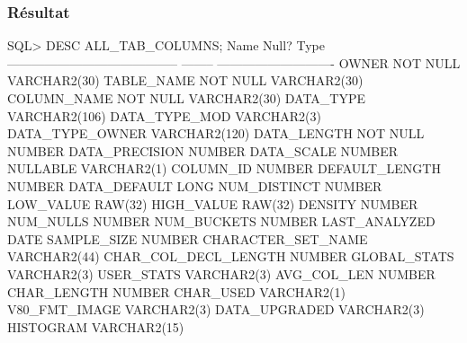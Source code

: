 \documentclass[•]{article}
\begin{document}
\subsubsection{Résultat}
\begin{sql}
SQL> DESC ALL_TAB_COLUMNS;
 Name                                      Null?    Type
 ----------------------------------------- -------- ----------------------------
 OWNER                                     NOT NULL VARCHAR2(30)
 TABLE_NAME                                NOT NULL VARCHAR2(30)
 COLUMN_NAME                               NOT NULL VARCHAR2(30)
 DATA_TYPE                                          VARCHAR2(106)
 DATA_TYPE_MOD                                      VARCHAR2(3)
 DATA_TYPE_OWNER                                    VARCHAR2(120)
 DATA_LENGTH                               NOT NULL NUMBER
 DATA_PRECISION                                     NUMBER
 DATA_SCALE                                         NUMBER
 NULLABLE                                           VARCHAR2(1)
 COLUMN_ID                                          NUMBER
 DEFAULT_LENGTH                                     NUMBER
 DATA_DEFAULT                                       LONG
 NUM_DISTINCT                                       NUMBER
 LOW_VALUE                                          RAW(32)
 HIGH_VALUE                                         RAW(32)
 DENSITY                                            NUMBER
 NUM_NULLS                                          NUMBER
 NUM_BUCKETS                                        NUMBER
 LAST_ANALYZED                                      DATE
 SAMPLE_SIZE                                        NUMBER
 CHARACTER_SET_NAME                                 VARCHAR2(44)
 CHAR_COL_DECL_LENGTH                               NUMBER
 GLOBAL_STATS                                       VARCHAR2(3)
 USER_STATS                                         VARCHAR2(3)
 AVG_COL_LEN                                        NUMBER
 CHAR_LENGTH                                        NUMBER
 CHAR_USED                                          VARCHAR2(1)
 V80_FMT_IMAGE                                      VARCHAR2(3)
 DATA_UPGRADED                                      VARCHAR2(3)
 HISTOGRAM                                          VARCHAR2(15)


\end{sql}
\end{document}
